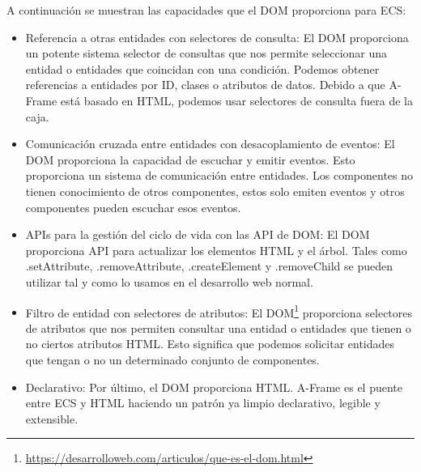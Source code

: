 \documentclass[a4paper, 12pt]{book}
\begin{document}
A continuación se muestran las capacidades que el DOM proporciona para ECS:
\begin{itemize}
    \item Referencia a otras entidades con selectores de consulta: El DOM proporciona un potente sistema selector de consultas que nos permite seleccionar una entidad o entidades que coincidan con una condición. Podemos obtener referencias a entidades por ID, clases o atributos de datos. Debido a que A-Frame está basado en HTML, podemos usar selectores de consulta fuera de la caja.
    
    \newpage
    \item Comunicación cruzada entre entidades con desacoplamiento de eventos: El DOM proporciona la capacidad de escuchar y emitir eventos. Esto proporciona un sistema de comunicación entre entidades. Los componentes no tienen conocimiento de otros componentes, estos solo emiten eventos y otros componentes pueden escuchar esos eventos.

    \item APIs para la gestión del ciclo de vida con las API de DOM: El DOM proporciona API para actualizar los elementos HTML y el árbol. Tales como .setAttribute, .removeAttribute, .createElement y .removeChild se pueden utilizar tal y como lo usamos en el desarrollo web normal.
   
    \item Filtro de entidad con selectores de atributos: El DOM\footnote{\url{https://desarrolloweb.com/articulos/que-es-el-dom.html}} proporciona selectores de atributos que nos permiten consultar una entidad o entidades que tienen o no ciertos atributos HTML. Esto significa que podemos solicitar entidades que tengan o no un determinado conjunto de componentes.
    
    \item Declarativo: Por último, el DOM proporciona HTML. A-Frame es el puente entre ECS y HTML haciendo un patrón ya limpio declarativo, legible y extensible.

\end{itemize}
\end{document}
